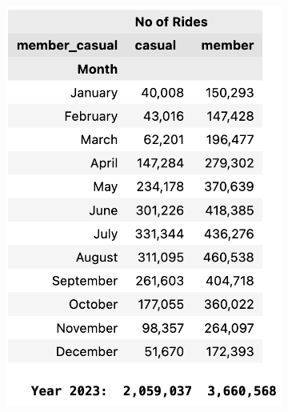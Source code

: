 \documentclass[12pt]{article}
\begin{document}
\begin{itemize}
	\begin{figure}[h]
	\hspace{0.8in}
	\begin{subfigure}{.2\textwidth}
		\includegraphics[scale=0.55]{img4.png} 
		\caption{}
		\label{fig17_1}
	\end{subfigure}
	\begin{subfigure}{.55\textwidth}
	\hspace{1.2in}

\end{subfigure}
\end{figure}
\end{itemize}
\end{document}
